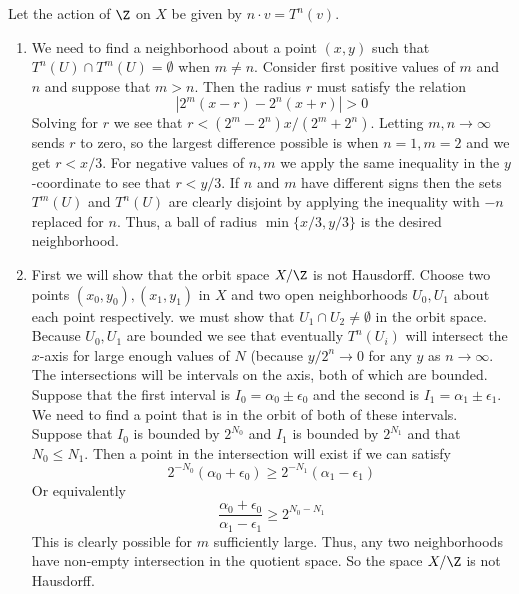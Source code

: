 \documentclass{article}
\begin{document}
\begin{solution}{0cm}
  Let the action of $\Z$ on $X$ be given by $n \cdot v = T^{n}(v)$.
  \begin{enumerate}
  \item We need to find a neighborhood about a point $(x,y)$ such that
    $T^n(U) \cap T^m(U) = \emptyset$ when $m \neq n$. Consider first
    positive values of $m$ and $n$ and suppose that $m > n$. Then the
    radius $r$ must satisfy the relation
    \[
    |2^m(x -r) - 2^n(x+r)| > 0
    \]
    Solving for $r$ we see that $r < (2^m-2^n)x/(2^m+2^n)$. Letting
    $m,n \to \infty$ sends $r$ to zero, so the largest difference
    possible is when $n=1,m=2$ and we get $r < x/3$. For negative
    values of $n,m$ we apply the same inequality in the $y$-coordinate
    to see that $r < y/3$. If $n$ and $m$ have different signs then
    the sets $T^m(U)$ and $T^n(U)$ are clearly disjoint by applying
    the inequality with $-n$ replaced for $n$. Thus, a ball of radius
    $\min\{x/3, y/3\}$ is the desired neighborhood.
  \item First we will show that the orbit space $X/\Z$ is not
    Hausdorff. Choose two points $(x_0,y_0), (x_1,y_1)$ in $X$ and two
    open neighborhoods $U_0, U_1$ about each point respectively. we
    must show that $U_1 \cap U_2 \neq \emptyset$ in the orbit
    space. Because $U_0, U_1$ are bounded we see that eventually
    $T^n(U_i)$ will intersect the $x$-axis for large enough values of
    $N$ (because $y/2^n \to 0$ for any $y$ as $n \to \infty$. The
    intersections will be intervals on the axis, both of which are
    bounded. Suppose that the first interval is $I_0 = \alpha_0 \pm
    \epsilon_0$ and the second is $I_1=\alpha_1 \pm \epsilon_1$. We
    need to find a point that is in the orbit of both of these
    intervals. Suppose that $I_0$ is bounded by $2^{N_0}$ and $I_1$ is
    bounded by $2^{N_1}$ and that $N_0 \leq N_1$. Then a point in the
    intersection will exist if we can satisfy
    \[
    2^{-N_0}(\alpha_0 + \epsilon_0) \geq 2^{-N_1}(\alpha_1 - \epsilon_1)
    \]
    Or equivalently
    \[
    \frac{\alpha_0 + \epsilon_0}{\alpha_1 - \epsilon_1} \geq 2^{N_0 - N_1}
    \]
    This is clearly possible for $m$ sufficiently large. Thus, any two
    neighborhoods have non-empty intersection in the quotient
    space. So the space $X/\Z$ is not Hausdorff.


\end{enumerate}
\end{solution}
\end{document}

